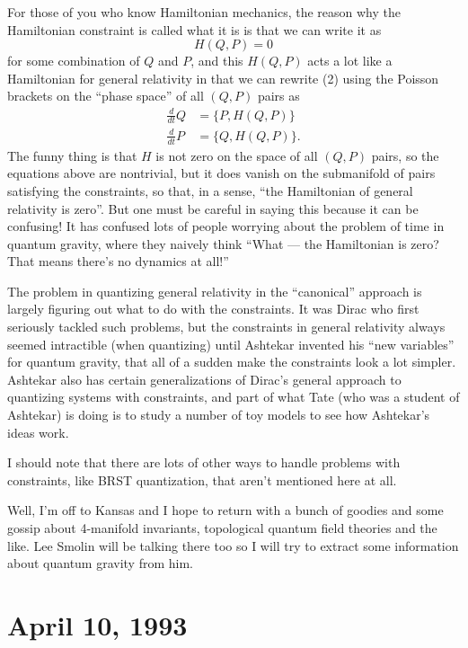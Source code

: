 \documentclass{article}
\begin{document}
For those of you who know Hamiltonian mechanics, the reason why the
Hamiltonian constraint is called what it is is that we can write it as
\[H(Q,P) = 0\] for some combination of \(Q\) and \(P\), and this
\(H(Q,P)\) acts a lot like a Hamiltonian for general relativity in that
we can rewrite (2) using the Poisson brackets on the ``phase space'' of
all \((Q,P)\) pairs as
\[\begin{aligned}\frac{d}{dt}Q &= \{P,H(Q,P)\} \\ \frac{d}{dt}P &= \{Q,H(Q,P)\}.\end{aligned}\]
The funny thing is that \(H\) is not zero on the space of all \((Q,P)\)
pairs, so the equations above are nontrivial, but it does vanish on the
submanifold of pairs satisfying the constraints, so that, in a sense,
``the Hamiltonian of general relativity is zero''. But one must be
careful in saying this because it can be confusing! It has confused lots
of people worrying about the problem of time in quantum gravity, where
they naively think ``What --- the Hamiltonian is zero? That means
there's no dynamics at all!''

The problem in quantizing general relativity in the ``canonical''
approach is largely figuring out what to do with the constraints. It was
Dirac who first seriously tackled such problems, but the constraints in
general relativity always seemed intractible (when quantizing) until
Ashtekar invented his ``new variables'' for quantum gravity, that all of
a sudden make the constraints look a lot simpler. Ashtekar also has
certain generalizations of Dirac's general approach to quantizing
systems with constraints, and part of what Tate (who was a student of
Ashtekar) is doing is to study a number of toy models to see how
Ashtekar's ideas work.

I should note that there are lots of other ways to handle problems with
constraints, like BRST quantization, that aren't mentioned here at all.

Well, I'm off to Kansas and I hope to return with a bunch of goodies and
some gossip about 4-manifold invariants, topological quantum field
theories and the like. Lee Smolin will be talking there too so I will
try to extract some information about quantum gravity from him.



\hypertarget{week12}{%
\section{April 10, 1993}\label{week12}}
\end{document}
